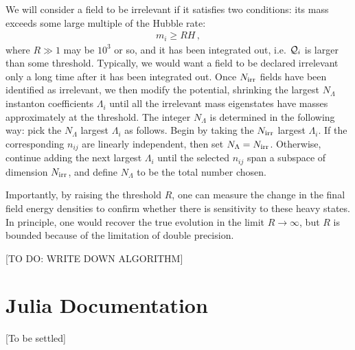 \documentclass{article}
\begin{document}
We will consider a field to be irrelevant if it satisfies two conditions: its mass exceeds some large multiple of the Hubble rate:
\begin{align}
    m_i \geq R H\,,
\end{align}
where $R\gg1$ may be $10^3$ or so, and it has been integrated out, i.e. ${\cal Q}_i$ is larger than some threshold. Typically, we would want a field to be declared irrelevant only a long time after it has been integrated out. Once $N_{\rm irr}$ fields have been identified as irrelevant, we then modify the potential, shrinking the largest $N_\Lambda$ instanton coefficients $\Lambda_i$ until all the irrelevant mass eigenstates have masses approximately at the threshold. The integer $N_\Lambda$ is determined in the following way: pick the $N_{\Lambda}$ largest $\Lambda_i$ as follows. Begin by taking the $N_{\rm irr}$ largest $\Lambda_i$. If the corresponding $n_{ij}$ are linearly independent, then set $N_{\Lambda} = N_{\rm irr}$. Otherwise, continue adding the next largest $\Lambda_i$ until the selected $n_{ij}$ span a subspace of dimension $N_{\rm irr}$, and define $N_{\Lambda}$ to be the total number chosen.  


Importantly, by raising the threshold $R$, one can measure the change in the final field energy densities to confirm whether there is sensitivity to these heavy states. In principle, one would recover the true evolution in the limit $R\to\infty$, but $R$ is bounded because of the limitation of double precision.

[TO DO: WRITE DOWN ALGORITHM]

\section{Julia Documentation}\label{sec:documentation}
[To be settled]


\end{document}
